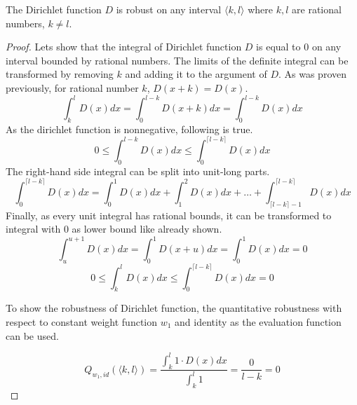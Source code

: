 \begin{lemma}{The Dirichlet function $D$ is robust on any interval $\langle k, l\rangle$
    where $k, l$ are rational numbers, $k\neq l$.}
\begin{proof}

        Lets show that the integral of Dirichlet function $D$ is equal
        to $0$ on any interval bounded by rational numbers.
        The limits of the definite integral can be transformed by removing $k$
        and adding it to the argument of $D$. As was proven previously,
        for rational number $k$, $D(x+k) = D(x)$.
        \begin{equation*}
            \int_{k}^{l} D(x) dx = \int_{0}^{l-k} D(x+k) dx = \int_{0}^{l-k} D(x) dx
        \end{equation*}
        As the dirichlet function is nonnegative, following is true.
        \begin{equation*}
            0 \leq \int_0^{l-k} D(x) dx \leq \int_0^{\lceil l-k \rceil} D(x) dx
        \end{equation*}
        The right-hand side integral can be split into unit-long parts.
        \begin{equation*}
            \int_0^{\lceil l-k\rceil} D(x) dx
            = \int_0^1 D(x) dx + \int_1^2 D(x) dx + \ldots
                + \int_{\lceil l-k \rceil-1}^{\lceil l-k \rceil} D(x) dx
        \end{equation*}
        Finally, as every unit integral has rational bounds,
        it can be transformed to integral with 0 as lower bound like already shown.
        \begin{equation*}
            \int_u^{u+1} D(x) dx = \int_0^1 D(x+u) dx = \int_0^1 D(x) dx = 0
        \end{equation*}
        \begin{equation*}
            0 \leq \int_{k}^{l} D(x) dx \leq \int_0^{\lceil l-k \rceil} D(x) dx = 0
        \end{equation*}

        To show the robustness of Dirichlet function, the quantitative robustness
        with respect to constant weight function $w_1$
        and identity as the evaluation function can be used.

        \begin{equation*}
            Q_{w_1, id}(\langle k, l\rangle)
            = \frac{\int_{k}^{l} 1\cdot D(x) dx}{\int_{k}^{l} 1} = \frac{0}{l-k} = 0
        \end{equation*}
    \end{proof}
\end{lemma}

